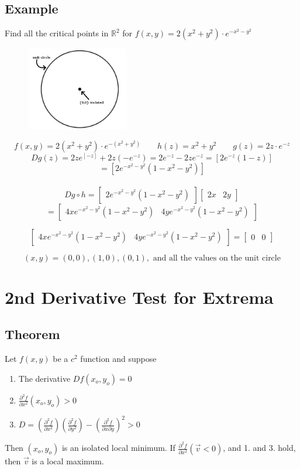 \documentclass{article}
\begin{document}
\subsection*{Example}
Find all the critical points in $\mathbb{R}^2$ for $f(x,y)=2(x^2+y^2)\cdot e^{-x^2-y^2}$
\begin{figure}
    \begin{center}
      \includegraphics[width=0.40\textwidth]{unitCircle.png}
    \end{center}
  \end{figure}
\[f(x,y)=2(x^2+y^2)\cdot e^{-(x^2+y^2)}\qquad h(z)=x^2+y^2\qquad g(z)=2z\cdot e^{-z}\]
\[Dg(z)=2ze^[-z]+2z(-e^{-z})=2e^{-z}-2ze^{-z}=[2e^{-z}(1-z)]\]
\[=[2e^{-x^2-y^2}(1-x^2-y^2)]\]\\[6pt]
\[Dg\circ h=\begin{bmatrix}
    2e^{-x^2-y^2}(1-x^2-y^2)
\end{bmatrix}\begin{bmatrix}
    2x&2y
\end{bmatrix}\]
\[=\begin{bmatrix}
    4xe^{-x^2-y^2}(1-x^2-y^2)&4ye^{-x^2-y^2}(1-x^2-y^2)
\end{bmatrix}\]

\[\begin{bmatrix}
    4xe^{-x^2-y^2}(1-x^2-y^2)&4ye^{-x^2-y^2}(1-x^2-y^2)
\end{bmatrix}=\begin{bmatrix}
    0&0
\end{bmatrix}\]

\[(x,y)=(0,0),(1,0),(0,1), \mbox{ and all the values on the unit circle}\]
\newpage
\section{2nd Derivative Test for Extrema}
\subsection*{Theorem}
Let $f(x,y)$ be a $c^2$ function and suppose
\begin{enumerate}
    \item The derivative $Df(x_o,y_o)=0$
    \item $\frac{\partial^2 f}{\partial x^2}(x_o,y_o)>0$
    \item $D=(\frac{\partial^2 f}{\partial x^2})(\frac{\partial^2 f}{\partial y^2})-(\frac{\partial^2 f}{\partial x \partial y})^{2}>0$
\end{enumerate}
Then $(x_o,y_o)$ is an isolated local minimum. If $\frac{\partial^2 f}{\partial x^2}(\vec{v} <0)$, and 1. and 3. hold, then $\vec{v}$ is a local maximum.
\end{document}
